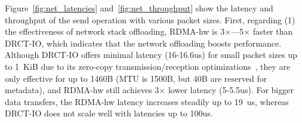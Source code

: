 

Figure~\ref{fig:net_latencies} and~\ref{fig:net_throughput} show the latency and throughput of the send operation with various packet sizes. First, regarding (1) the effectiveness of network stack offloading, RDMA-hw is 3$\times$---5$\times$ faster than DRCT-IO, which indicates that the network offloading boosts performance. Although DRCT-IO offers minimal latency (16-16.6us) for small packet sizes up to 1~KiB due to its zero-copy transmission/reception optimizations~\cite{erpc}, they are only effective for up to 1460B (MTU is 1500B, but 40B are reserved for metadata), and RDMA-hw still achieves 3$\times$ lower latency (5-5.5us). For bigger data transfers, the RDMA-hw latency increases steadily up to 19~us, whereas DRCT-IO does not scale well with latencies up to 100us. 


